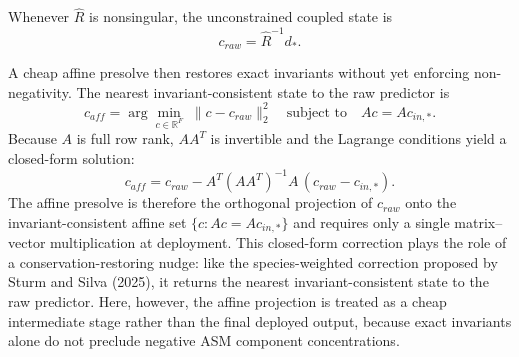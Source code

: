 \documentclass[a4paper,fleqn]{cas-sc}
\newenvironment{revblock}{}{}
\begin{document}
\begin{revblock}
Whenever $\widehat{R}$ is nonsingular, the unconstrained coupled state is
\begin{equation}
\label{eq:raw-coupled-state}
 c_{raw} = \widehat{R}^{-1} d_*.
\end{equation}

A cheap affine presolve then restores exact invariants without yet enforcing non-negativity. The nearest invariant-consistent state to the raw predictor is
\begin{equation}
\label{eq:affine-presolve}
 c_{aff} = \arg\min_{c \in \mathbb{R}^{F}} \; \|c - c_{raw}\|_2^2 \quad \text{subject to} \quad A c = A c_{in,*}.
\end{equation}
Because $A$ is full row rank, $AA^T$ is invertible and the Lagrange conditions yield a closed-form solution:
\begin{equation}
\label{eq:affine-closed-form}
 c_{aff} = c_{raw} - A^T(AA^T)^{-1}A\,(c_{raw} - c_{in,*}).
\end{equation}
The affine presolve is therefore the orthogonal projection of $c_{raw}$ onto the invariant-consistent affine set $\{c : Ac = Ac_{in,*}\}$ and requires only a single matrix--vector multiplication at deployment. This closed-form correction plays the role of a conservation-restoring nudge: like the species-weighted correction proposed by Sturm and Silva (2025), it returns the nearest invariant-consistent state to the raw predictor. Here, however, the affine projection is treated as a cheap intermediate stage rather than the final deployed output, because exact invariants alone do not preclude negative ASM component concentrations.


\end{revblock}
\end{document}
